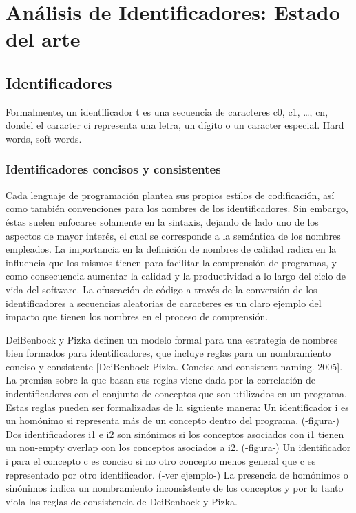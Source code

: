 \chapter{Análisis de Identificadores: Estado del arte}

\section{Identificadores}
Formalmente, un identificador t es una secuencia de caracteres c0, c1, …, cn, dondel el caracter ci representa una letra, un dígito o un caracter especial. Hard words, soft words.

\subsection{Identificadores concisos y consistentes}
Cada lenguaje de programación plantea sus propios estilos de codificación, así como también convenciones para los nombres de los identificadores. Sin embargo, éstas suelen enfocarse solamente en la sintaxis, dejando de lado uno de los aspectos de mayor interés, el cual se corresponde a la semántica de los nombres empleados. La importancia en la definición de nombres de calidad radica en la influencia que los mismos tienen para facilitar la comprensión de programas, y como consecuencia aumentar la calidad y la productividad a lo largo del ciclo de vida del software. La ofuscación de código a través de la conversión de los identificadores a secuencias aleatorias de caracteres es un claro ejemplo del impacto que tienen los nombres en el proceso de comprensión.

DeiBenbock y Pizka definen un modelo formal para una estrategia de nombres bien formados para identificadores, que incluye reglas para un nombramiento conciso y consistente [DeiBenbock Pizka. Concise and consistent naming. 2005]. La premisa sobre la que basan sus reglas viene dada por la correlación de indentificadores con el conjunto de conceptos que son utilizados en un programa.
Estas reglas pueden ser formalizadas de la siguiente manera:
Un identificador i es un homónimo si representa más de un concepto dentro del programa. (-figura-)
Dos identificadores i1 e i2 son sinónimos si los conceptos asociados con i1 tienen un non-empty overlap con los conceptos asociados a i2. (-figura-)
Un identificador i para el concepto c es conciso si no otro concepto menos general que c es representado por otro identificador. (-ver ejemplo-)
La presencia de homónimos o sinónimos indica un nombramiento inconsistente de los conceptos y por lo tanto viola las reglas de consistencia de DeiBenbock y Pizka.

